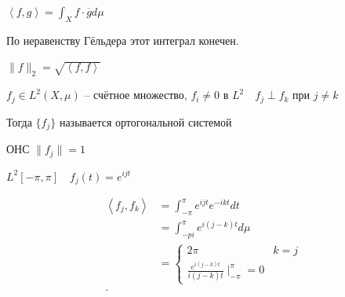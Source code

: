 \begin{definition}

    $\left<f,g \right> = \int_Xf \cdot \overline gd\mu$

    По неравенству Гёльдера этот интеграл конечен.

    $\|f\|_2 = \sqrt{\left<f,f \right>} $
\end{definition}

\begin{definition}
    $f_j\in L^2(X, \mu)$ -- счётное множество, $f_i \neq 0$ в  $L^2\quad f_j\perp f_k$ при $j\neq k$

    Тогда $\{f_j\}$ называется ортогональной системой

    ОНС $\|f_j\| = 1$
\end{definition}

\begin{example}
    $L^2[-\pi, \pi]\quad f_j(t) = e^{ijt}$

    \begin{align*}
        \left<f_j, f_k \right> &= \int_{-\pi}^{\pi} e^{ijt}e^{-ikt}dt \\
        &= \int_{-pi}^{\pi}e^{i(j-k)t}d\mu \\
        &= \begin{cases}
            2\pi&k=j\\
            \frac{e^{i(j-k)t}}{i(j-k)t}\mid_{-\pi}^{\pi} = 0
        \end{cases} \\
    .\end{align*}
\end{example}

